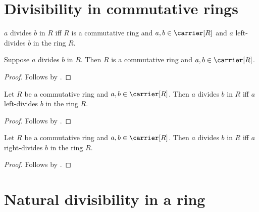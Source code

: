\section{Divisibility in commutative rings}

\begin{definition}\label{ring_divisibility}
    $a$ divides $b$ in $R$ iff
        $R$ is a commutative ring and $a,b\in\carrier[R]$ and
        $a$ left-divides $b$ in the ring $R$.
\end{definition}

\begin{proposition}\label{ring_divisibility_guards}
    Suppose $a$ divides $b$ in $R$.
    Then $R$ is a commutative ring and $a,b\in\carrier[R]$.
\end{proposition}
\begin{proof}
    Follows by .
\end{proof}

\begin{theorem}\label{ring_divisibility_iff_left}
    Let $R$ be a commutative ring and $a,b\in\carrier[R]$.
    Then $a$ divides $b$ in $R$ iff
        $a$ left-divides $b$ in the ring $R$.
\end{theorem}
\begin{proof}
    Follows by .
\end{proof}

\begin{theorem}\label{ring_divisibility_iff_right}
    Let $R$ be a commutative ring and $a,b\in\carrier[R]$.
    Then $a$ divides $b$ in $R$ iff
        $a$ right-divides $b$ in the ring $R$.
\end{theorem}
\begin{proof}
    Follows by
        .
\end{proof}

\section{Natural divisibility in a ring}

